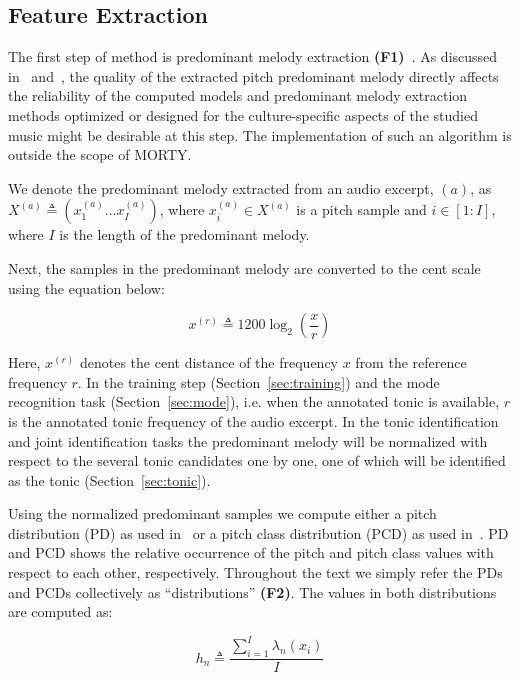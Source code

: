 \documentclass{sig-alternate}
\begin{document}
\subsection{Feature Extraction}\label{sec:feature}
The first step of method is predominant melody extraction {\bf(F1)}~\cite{bozkurt_tonic, chordia, bozkurt_makam}. As discussed in~\cite{atli2014makamFeature_atmm} and~\cite{bozkurt_tonic}, the quality of the extracted pitch predominant melody directly affects the reliability of the computed models and predominant melody extraction methods optimized or designed for the culture-specific aspects of the studied music might be desirable at this step. The implementation of such an algorithm is outside the scope of MORTY. 

We denote the predominant melody extracted from an audio excerpt, $(a)$, as $X^{(a)}  \triangleq \left(x^{(a)}_1 \dots x^{(a)}_I\right)$, where $x^{(a)}_i \in  X^{(a)}$ is a pitch sample and $i \in [1: I]$, where $I$ is the length of the predominant melody. 

Next, the samples in the predominant melody are converted to the cent scale using the equation below:

\begin{equation}
\label{eq:cent_norm}
x^{(r)}  \triangleq 1200 \log_2\left(\frac{x}{r}\right)
\end{equation}

Here, $x^{(r)}$ denotes the cent distance of the frequency $x$ from the reference frequency $r$. In the training step (Section~\ref{sec:training}) and the mode recognition task (Section~\ref{sec:mode}), i.e. when the annotated tonic is available, $r$ is the annotated tonic frequency of the audio excerpt. In the tonic identification and joint identification tasks the predominant melody will be normalized with respect to the several tonic candidates one by one, one of which will be identified as the tonic (Section~\ref{sec:tonic}).

Using the normalized predominant samples we compute either a pitch distribution (PD) as used in~\cite{bozkurt_makam} or a pitch class distribution (PCD) as used in~\cite{chordia}. PD and PCD shows the relative occurrence of the pitch and pitch class values with respect to each other, respectively. Throughout the text we simply refer the PDs and PCDs collectively as ``distributions'' {\bf (F2)}. The values in both distributions are computed as:

\begin{equation}
	h_n  \triangleq \frac{\sum_{i=1}^I \lambda_n\left(x_i\right)}{I}
	\label{eqn:histogram}
\end{equation}
\end{document}
